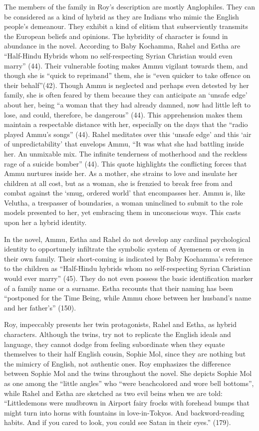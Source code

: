 The members of the family in Roy’s description are mostly Anglophiles. They can be considered as a kind of hybrid as they are Indians who mimic the English people’s demeanour. They exhibit a kind of elitism that subserviently transmits the European beliefs and opinions. The hybridity of character is found in abundance in the novel. According to Baby Kochamma, Rahel and Estha are “Half-Hindu Hybrids whom no self-respecting Syrian Christian would even marry” (44). Their vulnerable footing makes Ammu vigilant towards them, and though she is “quick to reprimand” them, she is “even quicker to take offence on their behalf”(42). Though Ammu is neglected and perhaps even detested by her family, she is often feared by them because they can anticipate an ‘unsafe edge’ about her, being “a woman that they had already damned, now had little left to lose, and could, therefore, be dangerous” (44). This apprehension makes them maintain a respectable distance with her, especially on the days that the “radio played Ammu’s songs” (44). Rahel meditates over this ‘unsafe edge’ and this ‘air of unpredictability’ that envelops Ammu, “It was what she had battling inside her. An unmixable mix. The infinite tenderness of motherhood and the reckless rage of a suicide bomber” (44). This quote highlights the conflicting forces that Ammu nurtures inside her. As a mother, she strains to love and insulate her children at all cost, but as a woman, she is frenzied to break free from and combat against the ‘smug, ordered world’ that encompasses her. Ammu is, like Velutha, a trespasser of boundaries, a woman uninclined to submit to the role models presented to her, yet embracing them in unconscious ways. This casts upon her a hybrid identity.   

In the novel, Ammu, Estha and Rahel do not develop any cardinal psychological identity to opportunely infiltrate the symbolic system of Ayemenem or even in their own family. Their short-coming is indicated by Baby Kochamma’s reference to the children as “Half-Hindu hybrids whom no self-respecting Syrian Christian would ever marry” (45). They do not even possess the basic identification marker of a family name or a surname. Estha recounts that their naming has been “postponed for the Time Being, while Ammu chose between her husband’s name and her father’s” (150).

Roy, impeccably presents her twin protagonists, Rahel and Estha, as hybrid characters. Although the twins, try not to replicate the English ideals and language, they cannot dodge from feeling subordinate when they equate themselves to their half English cousin, Sophie Mol, since they are nothing but the mimicry of English, not authentic ones. Roy emphasizes the difference between Sophie Mol and the twins throughout the novel. She depicts Sophie Mol as one among the “little angles” who “were beachcolored and wore bell bottoms”, while Rahel and Estha are sketched as two evil beins when we are told: “Littledemons were mudbrown in Airport fairy frocks with forehead bumps that might turn into horns with fountains in love-in-Tokyos. And backword-reading habits. And if you cared to look, you could see Satan in their eyes.” (179). 

